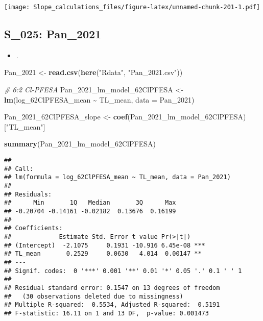\documentclass[
]{article}
\newenvironment{Shaded}{\begin{snugshade}}{\end{snugshade}}
\newcommand{\AttributeTok}[1]{\textcolor[rgb]{0.13,0.29,0.53}{#1}}
\newcommand{\CommentTok}[1]{\textcolor[rgb]{0.56,0.35,0.01}{\textit{#1}}}
\newcommand{\FunctionTok}[1]{\textcolor[rgb]{0.13,0.29,0.53}{\textbf{#1}}}
\newcommand{\NormalTok}[1]{#1}
\newcommand{\OtherTok}[1]{\textcolor[rgb]{0.56,0.35,0.01}{#1}}
\newcommand{\SpecialCharTok}[1]{\textcolor[rgb]{0.81,0.36,0.00}{\textbf{#1}}}
\newcommand{\StringTok}[1]{\textcolor[rgb]{0.31,0.60,0.02}{#1}}
\providecommand{\tightlist}{%
  \setlength{\itemsep}{0pt}\setlength{\parskip}{0pt}}
\begin{document}
\texttt{[image: Slope\_calculations\_files/figure-latex/unnamed-chunk-201-1.pdf]}

\subsection{S\_025: Pan\_2021}\label{s_025-pan_2021-1}

\begin{itemize}
\tightlist
\item
  .
\end{itemize}

\begin{Shaded}
\begin{Highlighting}[]
\NormalTok{Pan\_2021 }\OtherTok{\textless{}{-}} \FunctionTok{read.csv}\NormalTok{(}\FunctionTok{here}\NormalTok{(}\StringTok{"Rdata"}\NormalTok{, }\StringTok{"Pan\_2021.csv"}\NormalTok{))}

\CommentTok{\# 6:2 Cl{-}PFESA}
\NormalTok{Pan\_2021\_lm\_model\_62ClPFESA }\OtherTok{\textless{}{-}} \FunctionTok{lm}\NormalTok{(log\_62ClPFESA\_mean }\SpecialCharTok{\textasciitilde{}}\NormalTok{ TL\_mean,}
                                    \AttributeTok{data =}\NormalTok{ Pan\_2021)}

\NormalTok{Pan\_2021\_62ClPFESA\_slope }\OtherTok{\textless{}{-}} \FunctionTok{coef}\NormalTok{(Pan\_2021\_lm\_model\_62ClPFESA)[}\StringTok{"TL\_mean"}\NormalTok{]}

\FunctionTok{summary}\NormalTok{(Pan\_2021\_lm\_model\_62ClPFESA)}
\end{Highlighting}
\end{Shaded}

\begin{verbatim}
## 
## Call:
## lm(formula = log_62ClPFESA_mean ~ TL_mean, data = Pan_2021)
## 
## Residuals:
##      Min       1Q   Median       3Q      Max 
## -0.20704 -0.14161 -0.02182  0.13676  0.16199 
## 
## Coefficients:
##             Estimate Std. Error t value Pr(>|t|)    
## (Intercept)  -2.1075     0.1931 -10.916 6.45e-08 ***
## TL_mean       0.2529     0.0630   4.014  0.00147 ** 
## ---
## Signif. codes:  0 '***' 0.001 '**' 0.01 '*' 0.05 '.' 0.1 ' ' 1
## 
## Residual standard error: 0.1547 on 13 degrees of freedom
##   (30 observations deleted due to missingness)
## Multiple R-squared:  0.5534, Adjusted R-squared:  0.5191 
## F-statistic: 16.11 on 1 and 13 DF,  p-value: 0.001473
\end{verbatim}
\end{document}
